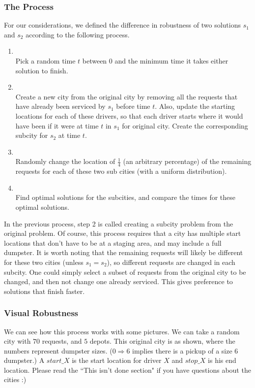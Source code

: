 \documentclass{article}
\begin{document}
\subsubsection{The Process}


For our considerations, we defined the difference in robustness of two solutions $s_1$ and $s_2$ according to the following process.

\begin{enumerate}
\item \hfill \\ Pick a random time $t$ between $0$ and the minimum time it takes either solution to finish.
\item \hfill \\  Create a new city from the original city by removing all the requests that have already been serviced by $s_1$ before time $t$.
Also, update the starting locations for each of these drivers, so that each driver starts where it would have been if it were at time $t$ in $s_1$ for original city.
Create the corresponding subcity for $s_2$ at time $t$.
\item \hfill \\  Randomly change the location of $\frac 1 4$ (an arbitrary percentage) of the remaining requests for each of these two sub cities (with a uniform distribution).
\item \hfill \\  Find optimal solutions for the subcities, and compare the times for these optimal solutions.
\end{enumerate}

In the previous process, step 2 is called creating a subcity problem from the original problem.
Of course, this process requires that a city has multiple start locations that don't have to be at a staging area, and may include a full dumpster.
It is worth noting that the remaining requests will likely be different for these two cities (unless $s_1 = s_2$), so different requests are changed in each subcity.
One could simply select a subset of requests from the original city to be changed, and then not change one already serviced.
This gives preference to solutions that finish faster.

\subsubsection{Visual Robustness}
We can see how this process works with some pictures.
We can take a random city with $70$ requests, and $5$ depots.
This original city is as shown, where the numbers represent dumpster sizes.
($0\Rightarrow 6$ implies there is a pickup of a size $6$ dumpster.)
A $start\_X$ is the start location for driver $X$ and $stop\_X$ is his end location.
Please read the ``This isn't done section" if you have questions about the cities :)
\end{document}
